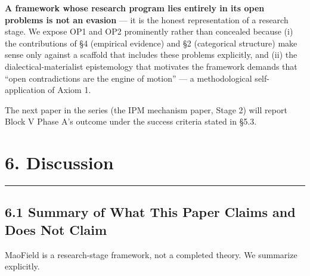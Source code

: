 \documentclass[
]{article}
\begin{document}
\textbf{A framework whose research program lies entirely in its open
problems is not an evasion} --- it is the honest representation of a
research stage. We expose OP1 and OP2 prominently rather than concealed
because (i) the contributions of §4 (empirical evidence) and §2
(categorical structure) make sense only against a scaffold that includes
these problems explicitly, and (ii) the dialectical-materialist
epistemology that motivates the framework demands that ``open
contradictions are the engine of motion'' --- a methodological
self-application of Axiom 1.

The next paper in the series (the IPM mechanism paper, Stage 2) will
report Block V Phase A's outcome under the success criteria stated in
§5.3.

\hypertarget{discussion}{%
\section{6. Discussion}\label{discussion}}

\begin{center}\rule{0.5\linewidth}{0.5pt}\end{center}

\hypertarget{summary-of-what-this-paper-claims-and-does-not-claim}{%
\subsection{6.1 Summary of What This Paper Claims and Does Not
Claim}\label{summary-of-what-this-paper-claims-and-does-not-claim}}

MaoField is a research-stage framework, not a completed theory. We
summarize explicitly.
\end{document}
